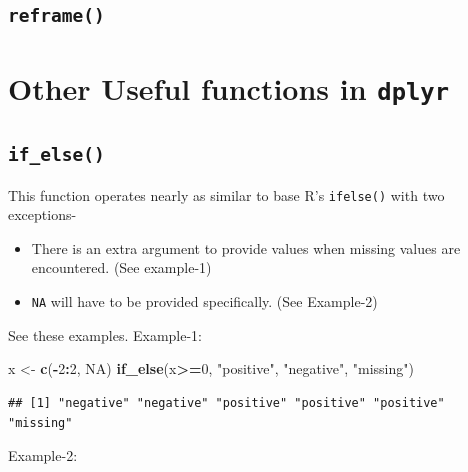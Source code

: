 \documentclass[
]{book}
\newenvironment{Shaded}{\begin{snugshade}}{\end{snugshade}}
\newcommand{\ConstantTok}[1]{\textcolor[rgb]{0.56,0.35,0.01}{#1}}
\newcommand{\DecValTok}[1]{\textcolor[rgb]{0.00,0.00,0.81}{#1}}
\newcommand{\FunctionTok}[1]{\textcolor[rgb]{0.13,0.29,0.53}{\textbf{#1}}}
\newcommand{\NormalTok}[1]{#1}
\newcommand{\OtherTok}[1]{\textcolor[rgb]{0.56,0.35,0.01}{#1}}
\newcommand{\SpecialCharTok}[1]{\textcolor[rgb]{0.81,0.36,0.00}{\textbf{#1}}}
\newcommand{\StringTok}[1]{\textcolor[rgb]{0.31,0.60,0.02}{#1}}
\providecommand{\tightlist}{%
  \setlength{\itemsep}{0pt}\setlength{\parskip}{0pt}}
\begin{document}
\hypertarget{reframe}{%
\subsection{\texorpdfstring{\texttt{reframe()}}{reframe()}}\label{reframe}}

\hypertarget{other-useful-functions-in-dplyr}{%
\section{\texorpdfstring{Other Useful functions in \texttt{dplyr}}{Other Useful functions in dplyr}}\label{other-useful-functions-in-dplyr}}

\hypertarget{if_else}{%
\subsection*{\texorpdfstring{\texttt{if\_else()}}{if\_else()}}\label{if_else}}

This function operates nearly as similar to base R's \texttt{ifelse()} with two exceptions-

\begin{itemize}
\tightlist
\item
  There is an extra argument to provide values when missing values are encountered. (See example-1)
\item
  \texttt{NA} will have to be provided specifically. (See Example-2)
\end{itemize}

See these examples. Example-1:

\begin{Shaded}
\begin{Highlighting}[]
\NormalTok{x }\OtherTok{\textless{}{-}} \FunctionTok{c}\NormalTok{(}\SpecialCharTok{{-}}\DecValTok{2}\SpecialCharTok{:}\DecValTok{2}\NormalTok{, }\ConstantTok{NA}\NormalTok{)}
\FunctionTok{if\_else}\NormalTok{(x}\SpecialCharTok{\textgreater{}=}\DecValTok{0}\NormalTok{, }\StringTok{"positive"}\NormalTok{, }\StringTok{"negative"}\NormalTok{, }\StringTok{"missing"}\NormalTok{)}
\end{Highlighting}
\end{Shaded}

\begin{verbatim}
## [1] "negative" "negative" "positive" "positive" "positive" "missing"
\end{verbatim}

Example-2:
\end{document}
